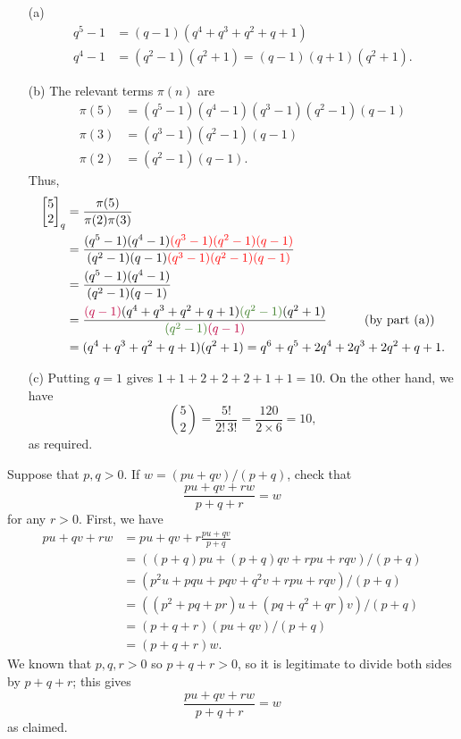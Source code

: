 \documentclass[a4paper]{book}
\newcommand{\RED}[1]{{\color{red}#1}}
\newcommand{\PURPLE}[1]{{\color{purple}#1}}
\newcommand{\OLIVEGREEN}[1]{{\color{olivegreen}#1}}
\newcommand{\bbm}       {\begin{bmatrix}}
\newcommand{\ebm}       {\end{bmatrix}}
\newcommand{\tm}        {\times}
\renewcommand{\:}{\colon}
\theoremstyle{definition}
\newenvironment{starex}{
 \renewcommand{\thetheorem}{\arabic{chapter}.\arabic{section}.\arabic{theorem}${}^*$}
 \exercise
}{\endexercise}
\renewenvironment{solution}{\SolutionInline}{\endSolutionInline}
\begin{document}
\begin{solution}
 \begin{itemize}
  \item[(a)] 
   \begin{align*}
    q^5-1  &= (q-1)(q^4+q^3+q^2+q+1) \\
    q^4-1  &= (q^2-1)(q^2+1) = (q-1)(q+1)(q^2+1).
   \end{align*}
  \item[(b)] The relevant terms $\pi(n)$ are
   \begin{align*}
    \pi(5) &= (q^5-1)(q^4-1)(q^3-1)(q^2-1)(q-1) \\
    \pi(3) &= (q^3-1)(q^2-1)(q-1) \\
    \pi(2) &= (q^2-1)(q-1).    
   \end{align*}
   Thus,
   \begin{align*}
    \bbm 5 \\ 2\ebm_q
     &= \frac{\pi(5)}{\pi(2)\pi(3)} \\
     &= \frac{(q^5-1)(q^4-1)\RED{(q^3-1)(q^2-1)(q-1)}}
             {(q^2-1)(q-1)\RED{(q^3-1)(q^2-1)(q-1)}} \\
     &= \frac{(q^5-1)(q^4-1)}{(q^2-1)(q-1)} \\
     &= \frac{\PURPLE{(q-1)}(q^4+q^3+q^2+q+1)\OLIVEGREEN{(q^2-1)}(q^2+1)}
             {\OLIVEGREEN{(q^2-1)}\PURPLE{(q-1)}}
              \hspace{3em} \text{(by part~(a))} \\
     &= (q^4+q^3+q^2+q+1)(q^2+1) = q^6+q^5+2q^4+2q^3+2q^2+q+1.    
   \end{align*}
  \item[(c)]
   Putting $q=1$ gives $1+1+2+2+2+1+1=10$.  On the other hand, we have
   \[ \binom{5}{2} = \frac{5!}{2!\,3!} = \frac{120}{2\tm 6} = 10, \]
   as required.
 \end{itemize}
\end{solution}
\begin{starex}
 Suppose that $p,q>0$. If $w=(pu+qv)/(p+q)$, check that
 \[ \frac{pu + qv + rw}{p+q+r} = w \]
 for any $r>0$.
\end{starex}
\begin{solution}
 First, we have
 \begin{align*}
  pu + qv + rw
   &= pu + qv + r\frac{pu+qv}{p+q} \\
   &= ((p+q)pu + (p+q)qv + rpu + rqv)/(p+q) \\
   &= (p^2u + pqu + pqv + q^2v + rpu + rqv)/(p+q) \\
   &= ((p^2+pq+pr)u + (pq+q^2+qr)v)/(p+q) \\
   &= (p+q+r)(pu+qv)/(p+q) \\
   &= (p+q+r)w.
 \end{align*}
 We known that $p,q,r>0$ so $p+q+r>0$, so it is legitimate to divide
 both sides by $p+q+r$; this gives 
 \[ \frac{pu + qv + rw}{p+q+r} = w \]
 as claimed.
\end{solution}
\end{document}
